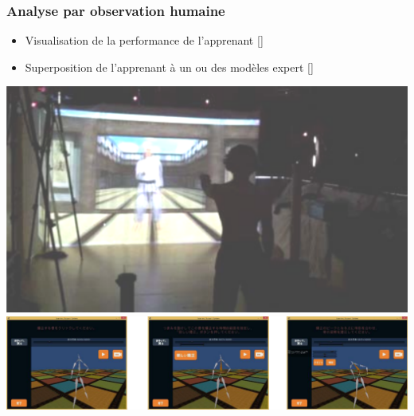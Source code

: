 \documentclass[svgnames]{beamer}
\newcommand{\mycite}[1]{[\textit{\cite{#1}}]}
\begin{document}
	\subsubsection{Analyse par observation humaine}
	\begin{frame}{\subsubsecname}
		\begin{itemize}[label=$\bullet$]
			\item Visualisation de la performance de l'apprenant \mycite{Burns2011Uvh}
			\item Superposition de l'apprenant à un ou des modèles expert \mycite{Yoshinaga2015Doa}
		\end{itemize}
		\centering
			\includegraphics[scale=0.4]{img/Burns_karate.png}
			\includegraphics[scale=0.4]{img/Yoshiniga_archery.png}
	\end{frame}
	
\end{document}
